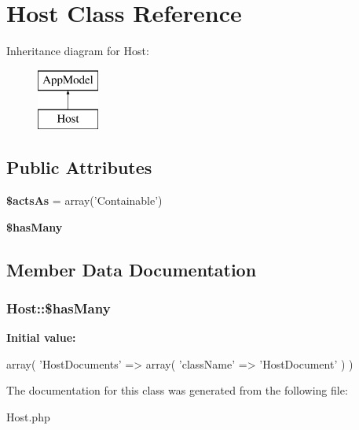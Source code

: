 \hypertarget{classHost}{
\section{\-Host \-Class \-Reference}
\label{classHost}
}
\-Inheritance diagram for \-Host\-:\begin{figure}[H]
\begin{center}
\leavevmode
\includegraphics[height=2.000000cm]{classHost}
\end{center}
\end{figure}
\subsection*{\-Public \-Attributes}
\begin{DoxyCompactItemize}
\item 
\hypertarget{classHost_a369be12bf592f85e5024d65cfc74be86}{
{\bfseries \$acts\-As} = array('\-Containable')}
\label{classHost_a369be12bf592f85e5024d65cfc74be86}

\item 
{\bfseries \$has\-Many}
\end{DoxyCompactItemize}


\subsection{\-Member \-Data \-Documentation}
\hypertarget{classHost_a20d9d76a15b4e8c1f9de56cdf8f4f66f}{
\subsubsection[{\$has\-Many}]{\setlength{\rightskip}{0pt plus 5cm}\-Host\-::\$has\-Many}}
\label{classHost_a20d9d76a15b4e8c1f9de56cdf8f4f66f}
{\bfseries \-Initial value\-:}
\begin{DoxyCode}
 array(
        'HostDocuments' => array(
            'className' => 'HostDocument'
        )
    )
\end{DoxyCode}


\-The documentation for this class was generated from the following file\-:\begin{DoxyCompactItemize}
\item 
\-Host.\-php\end{DoxyCompactItemize}
